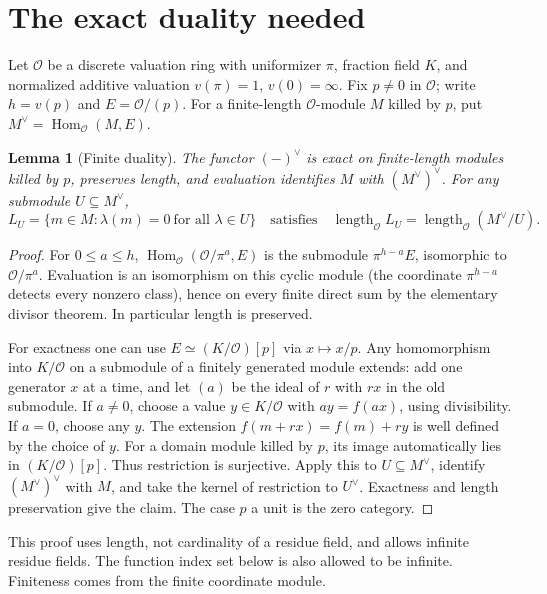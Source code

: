 \documentclass[11pt]{article}
\newtheorem{lemma}[theorem]{Lemma}
\theoremstyle{remark}\newtheorem{remark}[theorem]{Remark}
\newcommand{\Ocal}{\mathcal O}
\newcommand{\len}{\operatorname{length}_{\Ocal}}
\newcommand{\Hom}{\operatorname{Hom}_{\Ocal}}
\begin{document}
\section{The exact duality needed}
Let $\Ocal$ be a discrete valuation ring with uniformizer $\pi$, fraction field $K$, and normalized additive valuation $v(\pi)=1$, $v(0)=\infty$. Fix $p\ne0$ in $\Ocal$; write $h=v(p)$ and $E=\Ocal/(p)$. For a finite-length $\Ocal$-module $M$ killed by $p$, put $M^\vee=\Hom(M,E)$.
\begin{lemma}[Finite duality]\label{lem:duality}
The functor $(-)^\vee$ is exact on finite-length modules killed by $p$, preserves length, and evaluation identifies $M$ with $(M^\vee)^\vee$. For any submodule $U\subseteq M^\vee$,
\[
 L_U=\{m\in M:\lambda(m)=0\ \text{for all }\lambda\in U\}
 \quad\text{satisfies}\quad
 \len L_U=\len(M^\vee/U).
\]
\end{lemma}
\begin{proof}
For $0\le a\le h$, $\Hom(\Ocal/\pi^a,E)$ is the submodule $\pi^{h-a} E$, isomorphic to $\Ocal/\pi^a$. Evaluation is an isomorphism on this cyclic module (the coordinate $\pi^{h-a}$ detects every nonzero class), hence on every finite direct sum by the elementary divisor theorem. In particular length is preserved.

For exactness one can use $E\simeq (K/\Ocal)[p]$ via $x\mapsto x/p$. Any homomorphism into $K/\Ocal$ on a submodule of a finitely generated module extends: add one generator $x$ at a time, and let $(a)$ be the ideal of $r$ with $rx$ in the old submodule. If $a\ne0$, choose a value $y\in K/\Ocal$ with $ay=f(ax)$, using divisibility. If $a=0$, choose any $y$. The extension $f(m+rx)=f(m)+ry$ is well defined by the choice of $y$. For a domain module killed by $p$, its image automatically lies in $(K/\Ocal)[p]$. Thus restriction is surjective. Apply this to $U\subseteq M^\vee$, identify $(M^\vee)^\vee$ with $M$, and take the kernel of restriction to $U^\vee$. Exactness and length preservation give the claim. The case $p$ a unit is the zero category.
\end{proof}
This proof uses length, not cardinality of a residue field, and allows infinite residue fields. The function index set below is also allowed to be infinite. Finiteness comes from the finite coordinate module.
\end{document}
